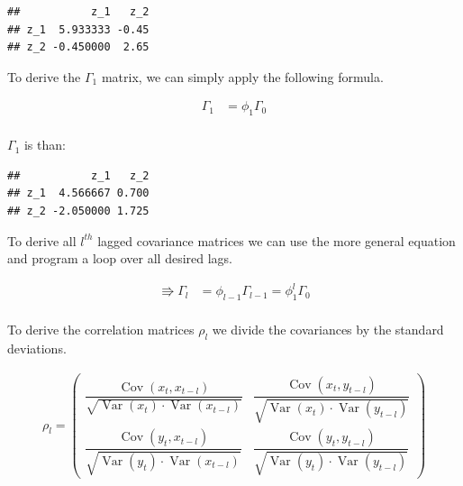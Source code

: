 \documentclass[12pt,a4paper]{article}
\newcommand{\Var}{\operatorname{Var}}
\newcommand{\Cov}{\operatorname{Cov}}
\newenvironment{Shaded}{\begin{snugshade}}{\end{snugshade}}
\newcommand{\NormalTok}[1]{#1}
\newcommand{\OperatorTok}[1]{\textcolor[rgb]{0.81,0.36,0.00}{\textbf{#1}}}
\newcommand{\StringTok}[1]{\textcolor[rgb]{0.31,0.60,0.02}{#1}}
\begin{document}
\begin{verbatim}
##           z_1   z_2
## z_1  5.933333 -0.45
## z_2 -0.450000  2.65
\end{verbatim}

To derive the \(\Gamma_1\) matrix, we can simply apply the following
formula.

\begin{align*}
  \Gamma_1 & = \phi_1 \Gamma_0\\
\end{align*}

\begin{Shaded}
\end{Shaded}

\(\Gamma_1\) is than:

\begin{verbatim}
##           z_1   z_2
## z_1  4.566667 0.700
## z_2 -2.050000 1.725
\end{verbatim}

To derive all \(l^{th}\) lagged covariance matrices we can use the more
general equation and program a loop over all desired lags.

\begin{align*}
  \Rrightarrow \Gamma_l & = \phi_{l-1} \Gamma_{l-1} = \phi_1^{l} \Gamma_0\\
\end{align*}

To derive the correlation matrices \(\rho_l\) we divide the covariances
by the standard deviations.

\begin{align*}
  \rho_l = 
  \begin{pmatrix}
    \dfrac{\Cov(x_t , x_{t-l})}{\sqrt{\Var(x_t) \cdot \Var(x_{t- l})}} &
    \dfrac{\Cov(x_t , y_{t-l})}{\sqrt{\Var(x_t) \cdot \Var(y_{t- l})}}\\
    \dfrac{\Cov(y_t , x_{t-l})}{\sqrt{\Var(y_t) \cdot \Var(x_{t- l})}} &
    \dfrac{\Cov(y_t , y_{t-l})}{\sqrt{\Var(y_t) \cdot \Var(y_{t- l})}}
  \end{pmatrix}\\
\end{align*}
\end{document}
